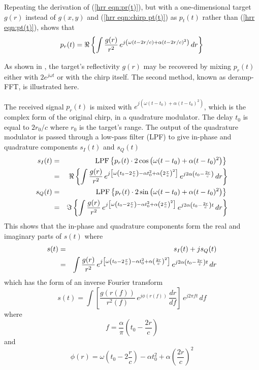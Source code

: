 Repeating the derivation of (\ref{hrr eqn:pr(t)}), but with a one-dimensional 
target $g(r)$ instead of $g(x,y)$ and (\ref{hrr eqn:chirp pt(t)}) as $p_t(t)$ 
rather than (\ref{hrr eqn:pt(t)}), shows that
\begin{equation}\label{hrr eqn:chirp pr(t)}
p_r(t)=\Re\left\{\int\frac{g(r)}{r^2}\,
e^{j\left(\omega (t-2r/c)+\alpha(t-2r/c)^2\right)}\,dr\right\}
\end{equation}

As shown in \cite{Mun89}, the target's reflectivity $g(r)$ may be recovered 
by mixing $p_r(t)$ either with $2e^{j\omega t}$ or with the chirp
itself.  The second method, known as deramp-FFT, is illustrated here.

The received signal $p_r(t)$ is mixed with $e^{j\left(\omega (t-t_0)+
\alpha(t-t_0)^2\right)}$, which is the complex form of the original chirp, 
in a quadrature modulator.  The delay $t_0$ is equal to $2r_0/c$ where $r_0$
is the target's range.  The output of the quadrature modulator is passed
through a low-pass filter (LPF) to give in-phase and quadrature components
$s_I(t)$ and $s_Q(t)$
\begin{eqnarray}
s_I(t)
&=&{\rm LPF}\left\{p_r(t)\cdot 
	2\cos\left(\omega (t-t_0)+\alpha(t-t_0)^2\right)\right\} {\nonumber}\\
&=&\Re\left\{\int\frac{g(r)}{r^2}\,e^{j\left[\omega\left(t_0-2\frac{r}{c}\right)
	-\alpha t_0^2+\alpha\left(2\frac{r}{c}\right)^2\right]}\,
	e^{j2\alpha\left(t_0-\frac{2r}{c}\right)}\,dr\right\} \\
s_Q(t)
&=&{\rm LPF}\left\{p_r(t)\cdot 
	2\sin\left(\omega (t-t_0)+\alpha(t-t_0)^2\right)\right\} {\nonumber}\\
&=&\Im\left\{\int\frac{g(r)}{r^2}\,e^{j\left[\omega\left(t_0-2\frac{r}{c}\right)
	-\alpha t_0^2+\alpha\left(2\frac{r}{c}\right)^2\right]}\,
	e^{j2\alpha\left(t_0-\frac{2r}{c}\right)t}\,dr\right\} 
\end{eqnarray}
This shows that the in-phase and quadrature components form the real and
imaginary parts of $s(t)$ where
\begin{eqnarray}
s(t)
&=&s_I(t)+js_Q(t){\nonumber}\\
&=&\int\frac{g(r)}{r^2}\,e^{j\left[\omega\left(t_0-2\frac{r}{c}\right)
	-\alpha t_0^2+\alpha\left(\frac{2r}{c}\right)^2\right]}\,
	e^{j2\alpha\left(t_0-\frac{2r}{c}\right)t}\,dr
\end{eqnarray}
which has the form of an inverse Fourier transform
\begin{equation}
s(t)
=\int\left[\frac{g(r(f))}{r^2(f)}\,e^{j\phi(r(f))}\,\frac{dr}{df}\right]\,
e^{j2\pi ft}\,df
\end{equation}
where
\begin{equation}\label{hrr eqn:f and r}
f=\frac{\alpha}{\pi}\left(t_0-\frac{2r}{c}\right)
\end{equation}
and 
\begin{equation}
\phi(r)=\omega\left(t_0-2\frac{r}{c}\right)
-\alpha t_0^2+\alpha\left(\frac{2r}{c}\right)^2
\end{equation}

